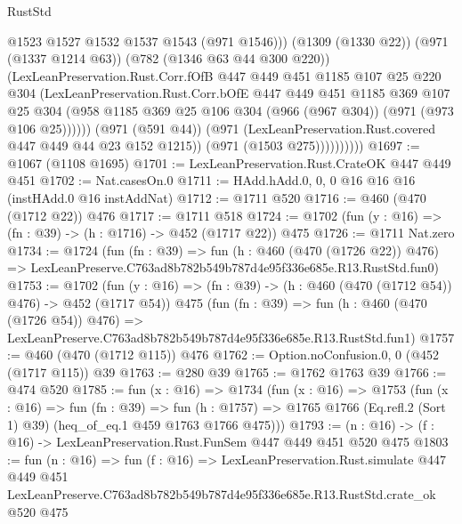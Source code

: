 \begin{lexlean}{RustStd}
\begin{coremodule}
                          @1523
                          @1527
                          @1532
                          @1537
                          @1543
                          (@971 @1546)))
                      (@1309 (@1330 @22))
                      (@971 (@1337 @1214 @63))
                      (@782 (@1346 @63 @44 @300 @220))
                      (LexLeanPreservation.Rust.Corr.fOfB
                        @447
                        @449
                        @451
                        @1185
                        @107
                        @25
                        @220
                        @304
                        (LexLeanPreservation.Rust.Corr.bOfE
                          @447
                          @449
                          @451
                          @1185
                          @369
                          @107
                          @25
                          @304
                          (@958
                            @1185
                            @369
                            @25
                            @106
                            @304
                            (@966 (@967 @304))
                            (@971 (@973 @106 @25))))))
                    (@971 (@591 @44))
                    (@971 (LexLeanPreservation.Rust.covered @447 @449 @44 @23 @152 @1215))
                    (@971 (@1503 @275))))))))))
@1697 := @1067 (@1108 @1695)
@1701 := LexLeanPreservation.Rust.CrateOK @447 @449 @451
@1702 := Nat.casesOn.{0}
@1711 := HAdd.hAdd.{0, 0, 0} @16 @16 @16 (instHAdd.{0} @16 instAddNat)
@1712 := @1711 @520
@1716 := @460 (@470 (@1712 @22)) @476
@1717 := @1711 @518
@1724 := @1702 (fun (y : @16) => (fn : @39) -> (h : @1716) -> @452 (@1717 @22)) @475
@1726 := @1711 Nat.zero
@1734 := @1724
    (fun (fn : @39) =>
    fun (h : @460 (@470 (@1726 @22)) @476) =>
    LexLeanPreserve.C763ad8b782b549b787d4e95f336e685e.R13.RustStd.fun0)
@1753 := @1702
    (fun (y : @16) => (fn : @39) -> (h : @460 (@470 (@1712 @54)) @476) -> @452 (@1717 @54))
    @475
    (fun (fn : @39) =>
    fun (h : @460 (@470 (@1726 @54)) @476) =>
    LexLeanPreserve.C763ad8b782b549b787d4e95f336e685e.R13.RustStd.fun1)
@1757 := @460 (@470 (@1712 @115)) @476
@1762 := Option.noConfusion.{0, 0} (@452 (@1717 @115)) @39
@1763 := @280 @39
@1765 := @1762 @1763 @39
@1766 := @474 @520
@1785 := fun (x : @16) =>
  @1734
    (fun (x : @16) =>
    @1753
      (fun (x : @16) =>
      fun (fn : @39) =>
      fun (h : @1757) =>
      @1765 @1766 (Eq.refl.{2} (Sort 1) @39) (heq_of_eq.{1} @459 @1763 @1766 @475)))
@1793 := (n : @16) -> (f : @16) -> LexLeanPreservation.Rust.FunSem @447 @449 @451 @520 @475
@1803 := fun (n : @16) =>
  fun (f : @16) =>
  LexLeanPreservation.Rust.simulate
    @447
    @449
    @451
    LexLeanPreserve.C763ad8b782b549b787d4e95f336e685e.R13.RustStd.crate_ok
    @520
    @475
\end{coremodule}
\end{lexlean}
